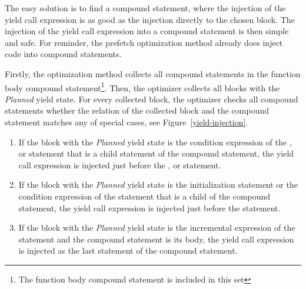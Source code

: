 The easy solution is to find a compound statement, where the injection of the yield call expression is as good as the injection directly to the chosen block. The injection of the yield call expression into a compound statement is then simple and safe. For reminder, the prefetch optimization method already does inject code into compound statements.

Firstly, the optimization method collects all compound statements in the function body compound statement\footnote{The function body compound statement is included in this set}. Then, the optimizer collects all blocks with the \emph{Planned} yield state. For every collected block, the optimizer checks all compound statements whether the relation of the collected block and the compound statement matches any of special cases, see Figure~\ref{yield-injection}.

\begin{enumerate}
\item{If the block with the \emph{Planned} yield state is the condition expression of the ,  or  statement that is a child statement of the compound statement, the yield call expression is injected just before the ,  or  statement.}
\item{If the block with the \emph{Planned} yield state is the initialization statement or the condition expression of the  statement that is a child of the compound statement, the yield call expression is injected just before the  statement.}
\item{If the block with the \emph{Planned} yield state is the incremental expression of the  statement and the compound statement is its body, the yield call expression is injected as the last statement of the compound statement.}
\end{enumerate}

